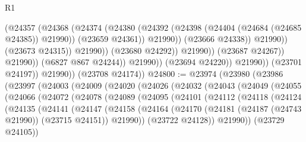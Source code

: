 \begin{lexlean}{R1}
\begin{coremodule}
                                            (@24357
                                              (@24368
                                                (@24374
                                                  (@24380
                                                    (@24392
                                                      (@24398
                                                        (@24404 (@24684 (@24685 @24385)) @21990))
                                                      (@23659 @24361))
                                                    @21990))
                                                (@23666 @24338))
                                              @21990))
                                          (@23673 @24315))
                                        @21990))
                                    (@23680 @24292))
                                  @21990))
                              (@23687 @24267))
                            @21990))
                        (@6827 @867 @24244))
                      @21990))
                  (@23694 @24220))
                @21990))
            (@23701 @24197))
          @21990))
      (@23708 @24174))
@24800 := @23974
    (@23980
      (@23986
        (@23997
          (@24003
            (@24009
              (@24020
                (@24026
                  (@24032
                    (@24043
                      (@24049
                        (@24055
                          (@24066
                            (@24072
                              (@24078
                                (@24089
                                  (@24095
                                    (@24101
                                      (@24112
                                        (@24118
                                          (@24124
                                            (@24135
                                              (@24141
                                                (@24147
                                                  (@24158
                                                    (@24164
                                                      (@24170
                                                        (@24181
                                                          (@24187 (@24743 @21990))
                                                          (@23715 @24151))
                                                        @21990))
                                                    (@23722 @24128))
                                                  @21990))
                                              (@23729 @24105))

\end{coremodule}
\end{lexlean}
